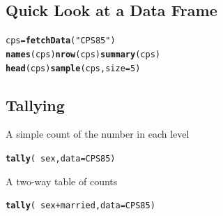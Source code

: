\documentclass{report}\usepackage{graphicx, color}
\makeatletter
\newcommand{\hlfunctioncall}[1]{\textcolor[rgb]{0.501960784313725,0,0.329411764705882}{\textbf{#1}}}%
\newcommand{\hlstring}[1]{\textcolor[rgb]{0.6,0.6,1}{#1}}%
\newenvironment{kframe}{%
 \def\at@end@of@kframe{}%
 \ifinner\ifhmode%
  \def\at@end@of@kframe{\end{minipage}}%
  \begin{minipage}{\columnwidth}%
 \fi\fi%
 \def\FrameCommand##1{\hskip\@totalleftmargin \hskip-\fboxsep
 \colorbox{shadecolor}{##1}\hskip-\fboxsep
     \hskip-\linewidth \hskip-\@totalleftmargin \hskip\columnwidth}%
 \MakeFramed {\advance\hsize-\width
   \@totalleftmargin\z@ \linewidth\hsize
   \@setminipage}}%
 {\par\unskip\endMakeFramed%
 \at@end@of@kframe}
\newenvironment{knitrout}{}{} %
\makeatother
\begin{document}
\begin{multicols}{4}
\footnotesize




\subsection*{Quick Look at a Data Frame}

\vspace*{-.1in}
\begin{knitrout}
\color{fgcolor}\begin{kframe}
\begin{alltt}
cps = \hlfunctioncall{fetchData}(\hlstring{"CPS85"})
\hlfunctioncall{names}(cps)   \hlfunctioncall{nrow}(cps)    \hlfunctioncall{summary}(cps)  
\hlfunctioncall{head}(cps)    \hlfunctioncall{sample}(cps,size=5)
\end{alltt}
\end{kframe}
\end{knitrout}


\vspace*{-.2in}

\subsection*{Tallying}
A simple count of the number in each level

\vspace*{-.1in}

\begin{knitrout}
\color{fgcolor}\begin{kframe}
\begin{alltt}
\hlfunctioncall{tally}(~sex, data = CPS85)
\end{alltt}
\end{kframe}
\end{knitrout}

A two-way table of counts

\vspace*{-.1in}

\begin{knitrout}
\color{fgcolor}\begin{kframe}
\begin{alltt}
\hlfunctioncall{tally}(~sex + married, data = CPS85)
\end{alltt}
\end{kframe}
\end{knitrout}



\end{multicols}
\end{document}
